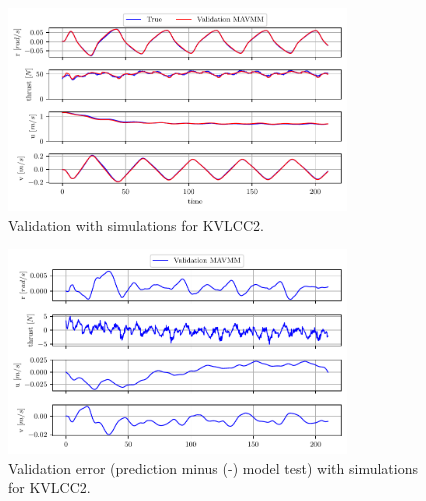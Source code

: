 \begin{figure}[h!]
\centering
\includegraphics[width=0.8\textwidth]{kappa/images/15.pdf}
\caption{Validation with simulations for KVLCC2.}\label{\detokenize{06.20_results_kvlcc2:fig-kvlcc2-validation-sim}}\end{figure}

\begin{figure}[h!]
\centering
\includegraphics[width=0.8\textwidth]{kappa/images/16.pdf}
\caption{Validation error (prediction minus (-) model test) with simulations for KVLCC2.}\label{\detokenize{06.20_results_kvlcc2:fig-kvlcc2-validation-sim-error}}\end{figure}
